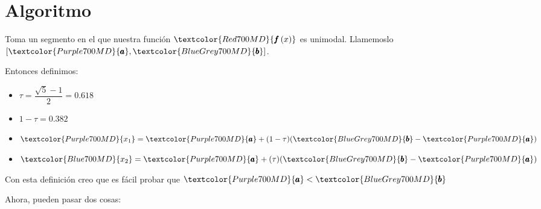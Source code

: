 \documentclass[12pt, fleqn]{report}                             %
\theoremstyle{break}                                            %
\newcommand{\Wrap}[1]           {\left( #1 \right)}             %
\newcommand{\Color}[2]{\textcolor{#1}{#2}}                      %
\newcommand \ColorFun          {Red700MD}                       %
\newcommand \ColorVarA         {Purple700MD}                    %
\newcommand \ColorVarB         {BlueGrey700MD}                  %
\newcommand \ColorVarXOne      {Purple700MD}                    %
\newcommand \ColorVarXTwo      {Blue700MD}                      %
\newcommand \Fun[1]      {\Color{\ColorFun}{\pmb{f}\Wrap{#1}}}          %
\newcommand \VarA        {\Color{\ColorVarA}{\pmb{a} }}                 %
\newcommand \VarB        {\Color{\ColorVarB}{\pmb{b} }}                 %
\newcommand \VarXOne     {\Color{\ColorVarXOne}{x_{1}  }}               %
\newcommand \VarXTwo     {\Color{\ColorVarXTwo}{x_{2}  }}               %
\begin{document}
            
        \section{Algoritmo}

            Toma un segmento en el que nuestra función $\Fun{x}$ es unimodal. Llamemoslo $[\VarA, \VarB]$.

            Entonces definimos:
            \begin{itemize}
                \item $\tau = \dfrac{\sqrt{5}-1}{2} = 0.618$
                \item $1 - \tau = 0.382$
                \item $\VarXOne = \VarA + (1-\tau)(\VarB - \VarA)$
                \item $\VarXTwo = \VarA + (\tau)  (\VarB - \VarA)$
            \end{itemize}

            Con esta definición creo que es fácil probar que $\VarA < \VarB$

            Ahora, pueden pasar dos cosas:
\end{document}
